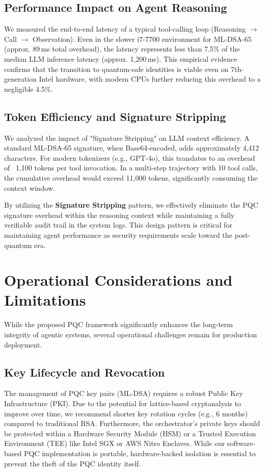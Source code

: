 \documentclass[conference]{IEEEtran}
\begin{document}
\subsection{Performance Impact on Agent Reasoning}
We measured the end-to-end latency of a typical tool-calling loop (Reasoning $\to$ Call $\to$ Observation). Even in the slower i7-7700 environment for ML-DSA-65 (approx. 89\,ms total overhead), the latency represents less than 7.5\% of the median LLM inference latency (approx. 1,200\,ms). This empirical evidence confirms that the transition to quantum-safe identities is viable even on 7th-generation Intel hardware, with modern CPUs further reducing this overhead to a negligible 4.5\%.

\subsection{Token Efficiency and Signature Stripping}
We analyzed the impact of "Signature Stripping" on LLM context efficiency. A standard ML-DSA-65 signature, when Base64-encoded, adds approximately 4,412 characters. For modern tokenizers (e.g., GPT-4o), this translates to an overhead of ~1,100 tokens per tool invocation. In a multi-step trajectory with 10 tool calls, the cumulative overhead would exceed 11,000 tokens, significantly consuming the context window.

By utilizing the \textbf{Signature Stripping} pattern, we effectively eliminate the PQC signature overhead within the reasoning context while maintaining a fully verifiable audit trail in the system logs. This design pattern is critical for maintaining agent performance as security requirements scale toward the post-quantum era.

\section{Operational Considerations and Limitations}
While the proposed PQC framework significantly enhances the long-term integrity of agentic systems, several operational challenges remain for production deployment.

\subsection{Key Lifecycle and Revocation}
The management of PQC key pairs (ML-DSA) requires a robust Public Key Infrastructure (PKI). Due to the potential for lattice-based cryptanalysis to improve over time, we recommend shorter key rotation cycles (e.g., 6 months) compared to traditional RSA. Furthermore, the orchestrator's private keys should be protected within a Hardware Security Module (HSM) or a Trusted Execution Environment (TEE) like Intel SGX or AWS Nitro Enclaves. While our software-based PQC implementation is portable, hardware-backed isolation is essential to prevent the theft of the PQC identity itself.
\end{document}
